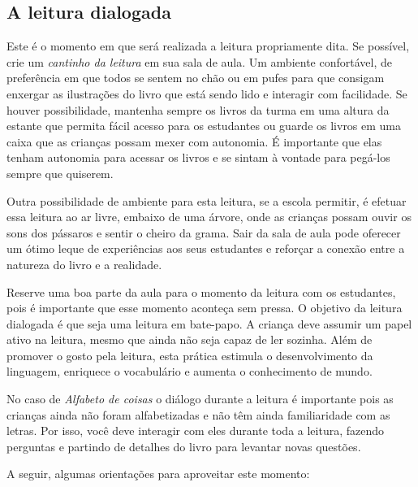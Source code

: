 \documentclass[11pt]{extarticle}
\begin{document}
\subsection{A leitura dialogada}
Este é o momento em que será realizada a leitura propriamente dita. 
Se possível, crie um \textit{cantinho da leitura} em sua sala de aula. Um 
ambiente confortável, de preferência em que todos se sentem no chão ou 
em pufes para que consigam enxergar as ilustrações do livro que está 
sendo lido e interagir com facilidade. Se houver possibilidade, mantenha 
sempre os livros da turma em uma altura da estante que permita fácil 
acesso para os estudantes ou guarde os livros em uma caixa que as crianças 
possam mexer com autonomia. É importante que elas tenham autonomia para 
acessar os livros e se sintam à vontade para pegá-los sempre que quiserem. 


Outra possibilidade de ambiente para esta leitura, se a escola permitir, 
é efetuar essa leitura ao ar livre, embaixo de uma árvore, onde as crianças 
possam ouvir os sons dos pássaros e sentir o cheiro da grama. Sair da sala 
de aula pode oferecer um ótimo leque de experiências aos seus estudantes e 
reforçar a conexão entre a natureza do livro e a realidade.  

Reserve uma boa parte da aula para o momento da leitura com os estudantes, 
pois é importante que esse momento aconteça sem pressa. O objetivo da 
leitura dialogada é que seja uma leitura em bate-papo. A criança deve 
assumir um papel ativo na leitura, mesmo que ainda não seja capaz de 
ler sozinha. Além de promover o gosto pela leitura, esta prática estimula 
o desenvolvimento da linguagem, enriquece o vocabulário e 
aumenta o conhecimento de mundo.

No caso de \textit{Alfabeto de coisas} o diálogo durante a leitura
é importante pois as crianças ainda não foram alfabetizadas 
e não têm ainda familiaridade com as letras. Por isso, 
você deve interagir com eles durante toda a 
leitura, fazendo perguntas e partindo de detalhes do livro para 
levantar novas questões. 

A seguir, algumas orientações para aproveitar este momento: 
\end{document}
